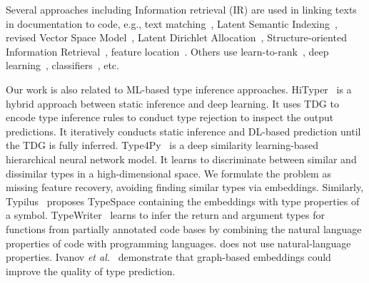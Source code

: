 Several approaches including Information retrieval (IR) are
used in linking texts in documentation to code, e.g., text
matching~\cite{bacchelli-icse10}, Latent Semantic
Indexing~\cite{marcus-icse03,delucia-ase08}, revised Vector Space
Model~\cite{buglocator-icse12,wang-icsm14}, Latent Dirichlet
Allocation~\cite{ase11,trase10}, Structure-oriented
Information Retrieval~\cite{saha-ase13,mcmillan11}, 
feature location~\cite{liu-ase07}.  Others use
learn-to-rank~\cite{ye-fse14}, deep learning~\cite{ase15-nier},
classifiers~\cite{kim-tse13}, etc. 

Our work is also related to ML-based type inference approaches.
HiTyper~\cite{HiTyper-icse22} is a hybrid approach between static
inference and deep learning. It uses TDG to encode type inference
rules to conduct type rejection to inspect the output predictions. It
iteratively conducts static inference and DL-based prediction until
the TDG is fully inferred.
Type4Py~\cite{Type4Py-icse22} is a deep similarity learning-based
hierarchical neural network model. It learns to discriminate between
similar and dissimilar types in a high-dimensional space.
We formulate the problem as missing feature recovery,
avoiding finding similar types via embeddings.
Similarly, Typilus~\cite{typilus-pldi20} proposes TypeSpace containing
the embeddings with type properties of a
symbol. TypeWriter~\cite{typewriter-fse20} learns to infer the return
and argument types for functions from partially annotated code bases
by combining the natural language properties of code with programming
languages. {\tool} does not use natural-language properties. Ivanov
{\em et al.}~\cite{ivanov21predicting} demonstrate that graph-based
embeddings could improve the quality of type prediction.